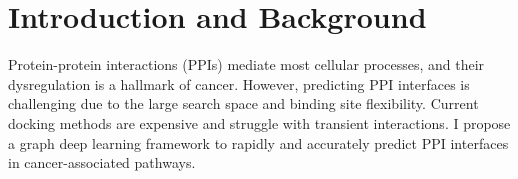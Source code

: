 \section{Introduction and Background}
Protein-protein interactions (PPIs) mediate most cellular processes, and their dysregulation is a hallmark of cancer. However, predicting PPI interfaces is challenging due to the large search space and binding site flexibility. Current docking methods are expensive and struggle with transient interactions. I propose a graph deep learning framework to rapidly and accurately predict PPI interfaces in cancer-associated pathways.
